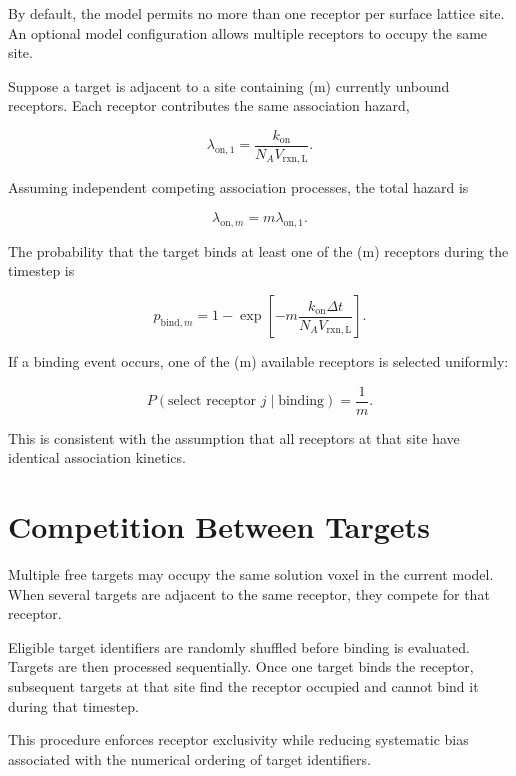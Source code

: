 \documentclass[11pt]{article}
\begin{document}
By default, the model permits no more than one receptor per surface lattice site. An optional model configuration allows multiple receptors to occupy the same site.

Suppose a target is adjacent to a site containing (m) currently unbound receptors. Each receptor contributes the same association hazard,

\begin{equation}
\lambda_{\mathrm{on},1}
=
\frac{k_{\mathrm{on}}}
{N_A V_{\mathrm{rxn,L}}}.
\end{equation}

Assuming independent competing association processes, the total hazard is

\begin{equation}
\lambda_{\mathrm{on},m}
=
m\lambda_{\mathrm{on},1}.
\end{equation}

The probability that the target binds at least one of the (m) receptors during the timestep is

\begin{equation}
\boxed{
p_{\mathrm{bind},m}
=
1-
\exp\left[
-
m
\frac{
k_{\mathrm{on}}\Delta t
}{
N_A V_{\mathrm{rxn,L}}
}
\right]
}.
\end{equation}

If a binding event occurs, one of the (m) available receptors is selected uniformly:

\begin{equation}
P(\text{select receptor }j\mid\text{binding})
=
\frac{1}{m}.
\end{equation}

This is consistent with the assumption that all receptors at that site have identical association kinetics.

\section{Competition Between Targets}

Multiple free targets may occupy the same solution voxel in the current model. When several targets are adjacent to the same receptor, they compete for that receptor.

Eligible target identifiers are randomly shuffled before binding is evaluated. Targets are then processed sequentially. Once one target binds the receptor, subsequent targets at that site find the receptor occupied and cannot bind it during that timestep.

This procedure enforces receptor exclusivity while reducing systematic bias associated with the numerical ordering of target identifiers.
\end{document}
